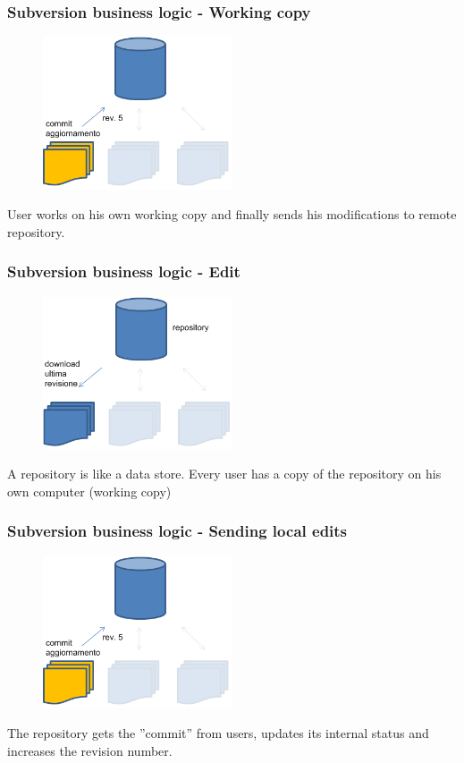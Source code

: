 \documentclass[10pt]{beamer}
\begin{document}
\begin{frame}[fragile]
\frametitle{Subversion business logic - Working copy}
\begin{figure}[h]
 \centering
 \includegraphics[width=0.5\textwidth]{images/svn-step2.png}
\end{figure}
User works on his own working copy and finally sends his modifications to remote repository.
\end{frame}

\begin{frame}[fragile]
\frametitle{Subversion business logic - Edit}
\begin{figure}[h]
 \centering
 \includegraphics[width=0.5\textwidth]{images/svn-step1.png}
\end{figure}
A repository is like a data store.
Every user has a copy of the repository on his own computer (working copy)
\end{frame}

\begin{frame}[fragile]
\frametitle{Subversion business logic - Sending local edits}
\begin{figure}[h]
 \centering
 \includegraphics[width=0.5\textwidth]{images/svn-step2.png}
\end{figure}
The repository gets the ''commit'' from users, updates its internal status and increases the revision number.
\end{frame}
\end{document}
